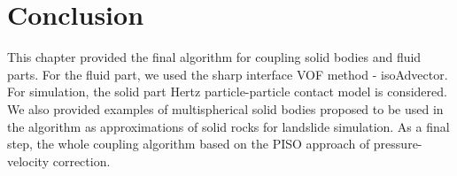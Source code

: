 \section{Conclusion}
This chapter provided the final algorithm for coupling solid bodies and fluid parts. For the fluid part, we used the sharp interface VOF method - isoAdvector\cite{roenby2019isoadvector}. For simulation, the solid part Hertz particle-particle contact model is considered. We also provided examples of multispherical solid bodies proposed to be used in the algorithm as approximations of solid rocks for landslide simulation.
As a final step, the whole coupling algorithm based on the PISO approach of pressure-velocity correction.
